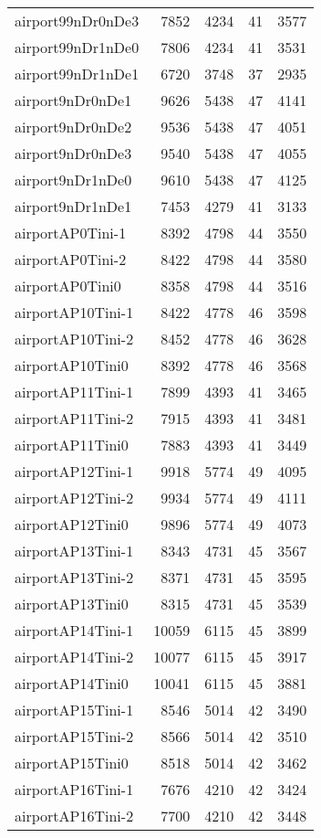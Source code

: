 \documentclass[../../../thesis.tex]{subfiles}
\begin{document}
\begin{longtable}{lrrrr}
airport99nDr0nDe3 & 7852 & 4234 & 41 & 3577 \\
airport99nDr1nDe0 & 7806 & 4234 & 41 & 3531 \\
airport99nDr1nDe1 & 6720 & 3748 & 37 & 2935 \\
airport9nDr0nDe1 & 9626 & 5438 & 47 & 4141 \\
airport9nDr0nDe2 & 9536 & 5438 & 47 & 4051 \\
airport9nDr0nDe3 & 9540 & 5438 & 47 & 4055 \\
airport9nDr1nDe0 & 9610 & 5438 & 47 & 4125 \\
airport9nDr1nDe1 & 7453 & 4279 & 41 & 3133 \\
airportAP0Tini-1 & 8392 & 4798 & 44 & 3550 \\
airportAP0Tini-2 & 8422 & 4798 & 44 & 3580 \\
airportAP0Tini0 & 8358 & 4798 & 44 & 3516 \\
airportAP10Tini-1 & 8422 & 4778 & 46 & 3598 \\
airportAP10Tini-2 & 8452 & 4778 & 46 & 3628 \\
airportAP10Tini0 & 8392 & 4778 & 46 & 3568 \\
airportAP11Tini-1 & 7899 & 4393 & 41 & 3465 \\
airportAP11Tini-2 & 7915 & 4393 & 41 & 3481 \\
airportAP11Tini0 & 7883 & 4393 & 41 & 3449 \\
airportAP12Tini-1 & 9918 & 5774 & 49 & 4095 \\
airportAP12Tini-2 & 9934 & 5774 & 49 & 4111 \\
airportAP12Tini0 & 9896 & 5774 & 49 & 4073 \\
airportAP13Tini-1 & 8343 & 4731 & 45 & 3567 \\
airportAP13Tini-2 & 8371 & 4731 & 45 & 3595 \\
airportAP13Tini0 & 8315 & 4731 & 45 & 3539 \\
airportAP14Tini-1 & 10059 & 6115 & 45 & 3899 \\
airportAP14Tini-2 & 10077 & 6115 & 45 & 3917 \\
airportAP14Tini0 & 10041 & 6115 & 45 & 3881 \\
airportAP15Tini-1 & 8546 & 5014 & 42 & 3490 \\
airportAP15Tini-2 & 8566 & 5014 & 42 & 3510 \\
airportAP15Tini0 & 8518 & 5014 & 42 & 3462 \\
airportAP16Tini-1 & 7676 & 4210 & 42 & 3424 \\
airportAP16Tini-2 & 7700 & 4210 & 42 & 3448 \\

\end{longtable}
\end{document}
